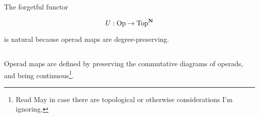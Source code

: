 \documentclass{amsart}
\begin{document}
\subsection{} The forgetful functor

$$
U : \mathrm{Op} \to \mathrm{Top}^{\mathbf{N}}
$$

is natural because operad maps are degree-preserving.

\subsection{} Operad maps are defined by preserving the commutative
diagrams of operads, and being continuous\footnote{Read May in case there
are topological or otherwise considerations I'm ignoring.}.



\end{document}
